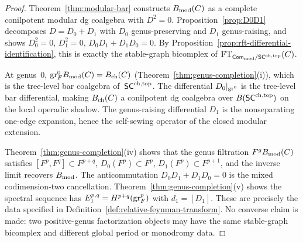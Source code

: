 \begin{proof}
Theorem~\ref{thm:modular-bar} constructs $B_{\mathrm{mod}}(C)$ as a
complete conilpotent modular dg coalgebra with $D^2 = 0$.
Proposition~\ref{prop:D0D1} decomposes $D = D_0 + D_1$ with
$D_0$ genus-preserving and $D_1$ genus-raising, and shows
$D_0^2 = 0$, $D_1^2 = 0$, $D_0 D_1 + D_1 D_0 = 0$. By
Proposition~\ref{prop:rft-differential-identification}, this is
exactly the stable-graph bicomplex of
$\mathrm{FT}_{\mathsf{Com}_{\mathrm{mod}} / \mathsf{SC}^{\mathrm{ch,top}}}(C)$.

At genus~$0$, $\mathrm{gr}_F^0 B_{\mathrm{mod}}(C) = B_{\mathrm{ch}}(C)$
(Theorem~\ref{thm:genus-completion}(i)), which is the tree-level
bar coalgebra of~$\mathsf{SC}^{\mathrm{ch,top}}$. The differential $D_0|_{\mathrm{gr}^0}$
is the tree-level bar differential, making $B_{\mathrm{ch}}(C)$ a
conilpotent dg coalgebra over $B(\mathsf{SC}^{\mathrm{ch,top}})$ on the local
operadic shadow. The genus-raising differential $D_1$ is the
nonseparating one-edge expansion, hence the self-sewing operator
of the closed modular extension.

Theorem~\ref{thm:genus-completion}(iv) shows that the genus
filtration $F^g B_{\mathrm{mod}}(C)$ satisfies
$[F^p, F^q] \subset F^{p+q}$, $D_0(F^p) \subset F^p$,
$D_1(F^p) \subset F^{p+1}$, and the inverse limit recovers
$B_{\mathrm{mod}}$. The anticommutation $D_0D_1+D_1D_0=0$ is the mixed
codimension-two cancellation.
Theorem~\ref{thm:genus-completion}(v) shows the spectral
sequence has $E_1^{p,q} = H^{p+q}(\mathrm{gr}_F^p)$ with
$d_1=[D_1]$. These are precisely the data specified in
Definition~\ref{def:relative-feynman-transform}. No converse
claim is made: two positive-genus factorization objects may have
the same stable-graph bicomplex and different global period or
monodromy data.
\end{proof}

